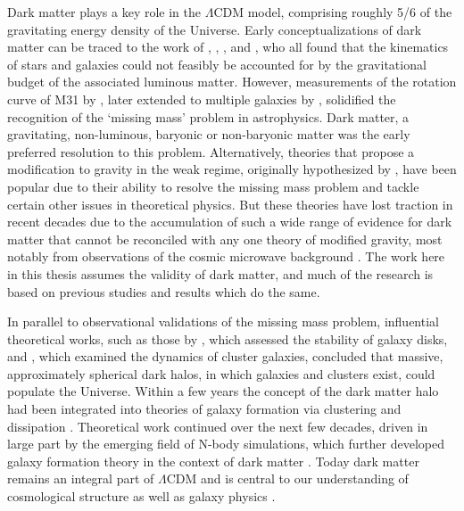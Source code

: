 Dark matter plays a key role in the $\Lambda$CDM model, comprising roughly 5/6 of the gravitating energy density of the Universe. Early conceptualizations of dark matter can be traced to the work of \textcite{kapteyn1922}, \textcite{oort32}, \textcite{zwicky33}, and \textcite{babcock39}, who all found that the kinematics of stars and galaxies could not feasibly be accounted for by the gravitational budget of the associated luminous matter. However, measurements of the rotation curve of M31 by \textcite{rubin70}, later extended to multiple galaxies by \textcite{rubin80}, solidified the recognition of the `missing mass' problem in astrophysics. Dark matter, a gravitating, non-luminous, baryonic or non-baryonic matter was the early preferred resolution to this problem. Alternatively, theories that propose a modification to gravity in the weak regime, originally hypothesized by \textcite{milgrom83}, have been popular due to their ability to resolve the missing mass problem and tackle certain other issues in theoretical physics. But these theories have lost traction in recent decades due to the accumulation of such a wide range of evidence for dark matter that cannot be reconciled with any one theory of modified gravity, most notably from observations of the cosmic microwave background \parencite[e.g.][]{netterfield02}. The work here in this thesis assumes the validity of dark matter, and much of the research is based on previous studies and results which do the same.

In parallel to observational validations of the missing mass problem, influential theoretical works, such as those by \textcite{ostriker73}, which assessed the stability of galaxy disks, and \textcite{einasto74}, which examined the dynamics of cluster galaxies, concluded that massive, approximately spherical dark halos, in which galaxies and clusters exist, could populate the Universe. Within a few years the concept of the dark matter halo had been integrated into theories of galaxy formation via clustering and dissipation \parencite{white78}. Theoretical work continued over the next few decades, driven in large part by the emerging field of N-body simulations, which further developed galaxy formation theory in the context of dark matter \parencite{white91}. Today dark matter remains an integral part of $\Lambda$CDM and is central to our understanding of cosmological structure as well as galaxy physics \parencite[e.g.][]{frenk12}.

